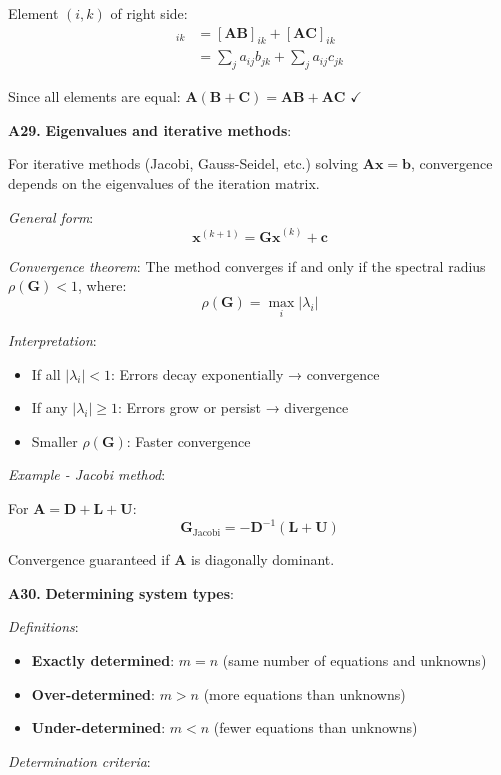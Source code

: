 \documentclass[12pt,a4paper]{article}
\theoremstyle{definition}
\begin{document}
Element $(i,k)$ of right side:
\begin{align*}
[\mathbf{AB} + \mathbf{AC}]_{ik} &= [\mathbf{AB}]_{ik} + [\mathbf{AC}]_{ik} \\
&= \sum_{j} a_{ij}b_{jk} + \sum_{j} a_{ij}c_{jk}
\end{align*}

Since all elements are equal: $\mathbf{A}(\mathbf{B} + \mathbf{C}) = \mathbf{AB} + \mathbf{AC}$ $\checkmark$

\textbf{A29.} \textbf{Eigenvalues and iterative methods}:

For iterative methods (Jacobi, Gauss-Seidel, etc.) solving $\mathbf{Ax} = \mathbf{b}$, convergence depends on the eigenvalues of the iteration matrix.

\textit{General form}:
\[
\mathbf{x}^{(k+1)} = \mathbf{Gx}^{(k)} + \mathbf{c}
\]

\textit{Convergence theorem}: The method converges if and only if the spectral radius $\rho(\mathbf{G}) < 1$, where:
\[
\rho(\mathbf{G}) = \max_i |\lambda_i|
\]

\textit{Interpretation}:
\begin{itemize}
\item If all $|\lambda_i| < 1$: Errors decay exponentially → convergence
\item If any $|\lambda_i| \geq 1$: Errors grow or persist → divergence
\item Smaller $\rho(\mathbf{G})$: Faster convergence
\end{itemize}

\textit{Example - Jacobi method}:

For $\mathbf{A} = \mathbf{D} + \mathbf{L} + \mathbf{U}$:
\[
\mathbf{G}_{\text{Jacobi}} = -\mathbf{D}^{-1}(\mathbf{L} + \mathbf{U})
\]

Convergence guaranteed if $\mathbf{A}$ is diagonally dominant.

\textbf{A30.} \textbf{Determining system types}:

\textit{Definitions}:
\begin{itemize}
\item \textbf{Exactly determined}: $m = n$ (same number of equations and unknowns)
\item \textbf{Over-determined}: $m > n$ (more equations than unknowns)
\item \textbf{Under-determined}: $m < n$ (fewer equations than unknowns)
\end{itemize}

\textit{Determination criteria}:
\end{document}
